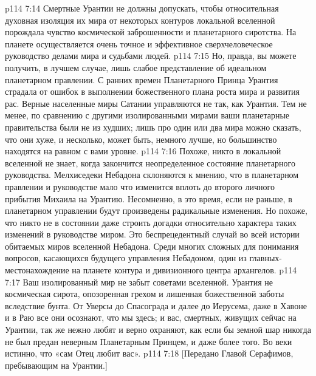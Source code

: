 \vs p114 7:14 \pc Смертные Урантии не должны допускать, чтобы относительная духовная изоляция их мира от некоторых контуров локальной вселенной порождала чувство космической заброшенности и планетарного сиротства. На планете осуществляется очень точное и эффективное сверхчеловеческое руководство делами мира и судьбами людей.
\vs p114 7:15 Но, правда, вы можете получить, в лучшем случае, лишь слабое представление об идеальном планетарном правлении. С ранних времен Планетарного Принца Урантия страдала от ошибок в выполнении божественного плана роста мира и развития рас. Верные населенные миры Сатании управляются не так, как Урантия. Тем не менее, по сравнению с другими изолированными мирами ваши планетарные правительства были не из худших; лишь про один или два мира можно сказать, что они хуже, и несколько, может быть, немного лучше, но большинство находятся на равном с вами уровне.
\vs p114 7:16 Похоже, никто в локальной вселенной не знает, когда закончится неопределенное состояние планетарного руководства. Мелхиседеки Небадона склоняются к мнению, что в планетарном правлении и руководстве мало что изменится вплоть до второго личного прибытия Михаила на Урантию. Несомненно, в это время, если не раньше, в планетарном управлении будут произведены радикальные изменения. Но похоже, что никто не в состоянии даже строить догадки относительно характера таких изменений в руководстве миром. Это беспрецедентный случай во всей истории обитаемых миров вселенной Небадона. Среди многих сложных для понимания вопросов, касающихся будущего управления Небадоном, один из главных\hyp{}местонахождение на планете контура и дивизионного центра архангелов.
\vs p114 7:17 Ваш изолированный мир не забыт советами вселенной. Урантия не космическая сирота, опозоренная грехом и лишенная божественной заботы вследствие бунта. От Уверсы до Спасограда и далее до Иерусема, даже в Хавоне и в Раю все они осознают, что мы здесь; и вас, смертных, живущих сейчас на Урантии, так же нежно любят и верно охраняют, как если бы земной шар никогда не был предан неверным Планетарным Принцем, и даже более того. Во веки истинно, что «сам Отец любит вас».
\vsetoff
\vs p114 7:18 [Передано Главой Серафимов, пребывающим на Урантии.]
